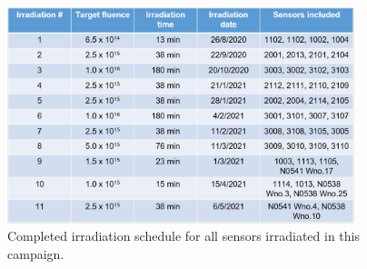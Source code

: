 \begin{figure}[!hbt]
  \begin{center}
    \includegraphics[width=0.90\textwidth]{figures/Completed_Irradiation_Schedule_at_RINSC}
    \caption{Completed irradiation schedule for all sensors irradiated in this campaign.}
    \label{fig:Irradiation_Schedule}
  \end{center}
\end{figure}

\label{subsec:sensors_irradiation}
